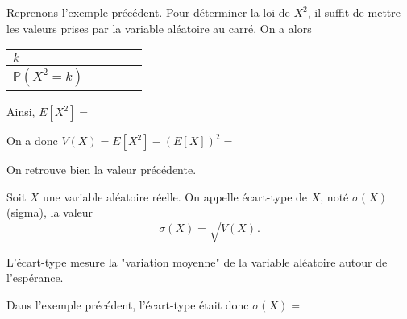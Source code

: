 \documentclass[11pt,fleqn, openany]{book} %
\begin{document}
\begin{example}
Reprenons l'exemple précédent. Pour déterminer la loi de $X^2$, il suffit de mettre les valeurs prises par la variable aléatoire au carré. On a alors

\renewcommand{\arraystretch}{2.2}
\begin{center}
\begin{tabularx}{0.9\linewidth}{|l|X|X|X|X|}
\hline
$k$ & &  & & \\
\hline
$\mathbb{P}(X^2=k)$ &  &  &  & \\
\hline \end{tabularx}
\end{center}

Ainsi, $E[X^2]=$

On a donc $V(X)=E[X^2]-(E[X])^2=$ 

On retrouve bien la valeur précédente.

\end{example}

\begin{definition} Soit $X$ une variable aléatoire réelle. On appelle écart-type de $X$, noté $\sigma(X)$ (sigma), la valeur
\[ \sigma (X)= \sqrt{V(X)}.\]\end{definition}

L'écart-type mesure la "variation moyenne" de la variable aléatoire autour de l'espérance.

\begin{example}Dans l'exemple précédent, l'écart-type était donc $\sigma(X)=$\end{example}
\end{document}
